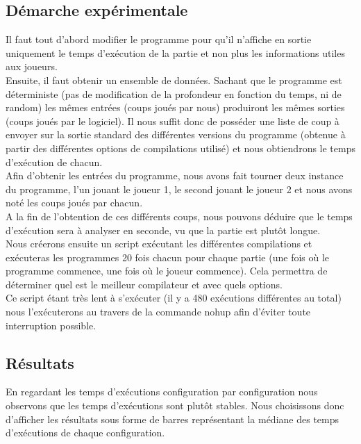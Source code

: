 \documentclass[
 aip,
 jmp,
 amsmath,amssymb,
 reprint
]{revtex4-1}
\begin{document}
\subsection{Démarche expérimentale}
Il faut tout d'abord modifier le programme pour qu'il n'affiche en sortie uniquement le temps d'exécution de la partie et non plus les informations utiles aux joueurs.\\
Ensuite, il faut obtenir un ensemble de données. Sachant que le programme est déterministe (pas de modification de la profondeur en fonction du temps, ni de random) les mêmes entrées (coups joués par nous) produiront les mêmes sorties (coups joués par le logiciel). Il nous suffit donc de posséder une liste de coup à envoyer sur la sortie standard des différentes versions du programme (obtenue à partir des différentes options de compilations utilisé) et nous obtiendrons le temps d'exécution de chacun.\\
Afin d'obtenir les entrées du programme, nous avons fait tourner deux instance du programme, l'un jouant le joueur 1, le second jouant le joueur 2 et nous avons noté les coups joués par chacun.\\
A la fin de l'obtention de ces différents coups, nous pouvons déduire que le temps d'exécution sera à analyser en seconde, vu que la partie est plutôt longue.\\
Nous créerons ensuite un script exécutant les différentes compilations et exécuteras les programmes 20 fois chacun pour chaque partie (une fois où le programme commence, une fois où le joueur commence). Cela permettra de déterminer quel est le meilleur compilateur et avec quels options.\\
Ce script étant très lent à s'exécuter (il y a 480 exécutions différentes au total) nous l'exécuterons au travers de la commande nohup afin d'éviter toute interruption possible.\\

\subsection{Résultats}
En regardant les temps d'exécutions configuration par configuration nous observons que les temps d'exécutions sont plutôt stables. Nous choisissons donc d'afficher les résultats sous forme de barres représentant la médiane des temps d'exécutions de chaque configuration.
\end{document}
